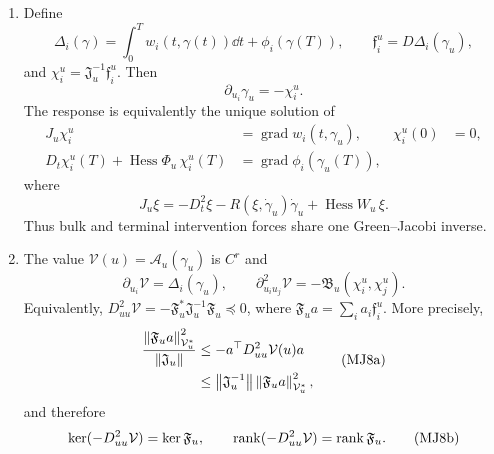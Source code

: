 \begin{theorem}
\begin{enumerate}[leftmargin=*,itemsep=0.35em]
  \item Define
  \[
    \Delta_i(\gamma)
    =\int_0^T w_i(t,\gamma(t))\dd t+\phi_i(\gamma(T)),
    \qquad
    \mathfrak f_i^u=D\Delta_i(\gamma_u),
  \]
  and \(\chi_i^u=\mathfrak J_u^{-1}\mathfrak f_i^u\).  Then
  \begin{equation}
    \partial_{u_i}\gamma_u=-\chi_i^u.
    \tag{MJ6}
  \end{equation}
  The response is equivalently the unique solution of
  \begin{equation}
  \begin{aligned}
    J_u\chi_i^u&=\operatorname{grad}w_i(t,\gamma_u),
    &\chi_i^u(0)&=0,\\
    D_t\chi_i^u(T)+\operatorname{Hess}\Phi_u\,\chi_i^u(T)
    &=\operatorname{grad}\phi_i(\gamma_u(T)),
  \end{aligned}
  \tag{MJ7}
  \end{equation}
  where
  \[
    J_u\xi=-D_t^2\xi-R(\xi,\dot\gamma_u)\dot\gamma_u
    +\operatorname{Hess}W_u\,\xi.
  \]
  Thus bulk and terminal intervention forces share one Green--Jacobi inverse.

  \item The value \(\mathcal V(u)=\mathcal A_u(\gamma_u)\) is \(C^r\) and
  \begin{equation}
    \partial_{u_i}\mathcal V=\Delta_i(\gamma_u),
    \qquad
    \partial_{u_i u_j}^2\mathcal V
    =-\mathfrak B_u(\chi_i^u,\chi_j^u).
    \tag{MJ8}
  \end{equation}
  Equivalently,
  \(D_{uu}^2\mathcal V=-\mathfrak F_u^*\mathfrak J_u^{-1}\mathfrak F_u
  \preceq0\), where \(\mathfrak F_ua=\sum_i a_i\mathfrak f_i^u\).
  More precisely,
  \begin{equation}
  \begin{aligned}
    \frac{\left\lVert \mathfrak F_ua\right\rVert_{\mathcal V_u^*}^2}
    {\left\lVert \mathfrak J_u\right\rVert}
    &\le -a^\top D_{uu}^2\mathcal V(u)a\\
    &\le
    \left\lVert \mathfrak J_u^{-1}\right\rVert
    \left\lVert \mathfrak F_ua\right\rVert_{\mathcal V_u^*}^2,
  \end{aligned}
  \tag{MJ8a}
  \end{equation}
  and therefore
  \begin{equation}
    \ker(-D_{uu}^2\mathcal V)=\ker\mathfrak F_u,
    \qquad
    \operatorname{rank}(-D_{uu}^2\mathcal V)=\operatorname{rank}\mathfrak F_u.
    \tag{MJ8b}
  \end{equation}


\end{enumerate}
\end{theorem}
